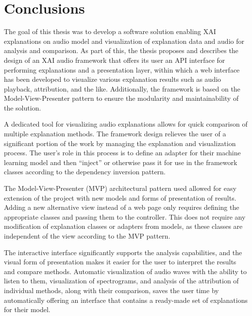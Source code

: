 \documentclass[
    bindingoffset=5mm,  %
    footnoteindent=3mm, %
    hyphenation=true    %
]{src/wut-thesis}
\begin{document}
%
%
\clearpage %
\section{Conclusions} \label{ch:summary}

The goal of this thesis was to develop a software solution enabling XAI explanations on audio model
and visualization of explanation data and audio for analysis and comparison. 
As part of this, the thesis proposes and describes the design of an XAI audio framework that offers its 
user an API interface for performing explanations and a presentation layer, within which a web interface
has been developed to visualize various explanation results such as audio playback, attribution, and the like.
Additionally, the framework is based on the Model-View-Presenter pattern to ensure
the modularity and maintainability of the solution.

A dedicated tool for visualizing audio explanations allows for quick comparison of multiple explanation methods.
The framework design relieves the user of a significant portion of the work by managing the explanation and
visualization process. The user's role in this process is to define an adapter for their machine learning model
and then “inject” or otherwise pass it for use in the framework classes according to the dependency inversion
pattern.

The Model-View-Presenter (MVP) architectural pattern used allowed for easy extension of the project with new
models and forms of presentation of results. Adding a new alternative view instead of a web page only requires
defining the appropriate classes and passing them to the controller. This does not require any modification of
explanation classes or adapters from models, as these classes are independent of the view according to the MVP
pattern.

The interactive interface significantly supports the analysis capabilities, and the visual form of presentation
makes it easier for the user to interpret the results and compare methods. Automatic visualization of audio waves
with the ability to listen to them, visualization of spectrograms, and analysis of the attribution of individual
methods, along with their comparison, saves the user time by automatically offering an interface that contains a
ready-made set of explanations for their model.
\end{document}
